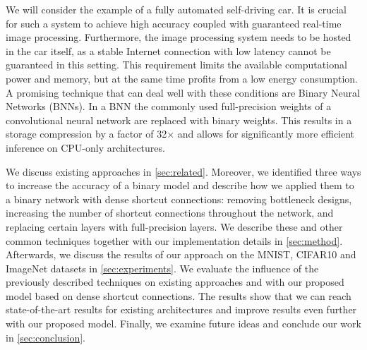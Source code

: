 \documentclass[10pt,twocolumn,letterpaper]{article}
\begin{document}
We will consider the example of a fully automated self-driving car. %
It is crucial for such a system to achieve high accuracy coupled with guaranteed real-time image processing.
Furthermore, the image processing system needs to be hosted in the car itself, as a stable Internet connection with low latency cannot be guaranteed in this setting.
This requirement limits the available computational power and memory, but at the same time profits from a low energy consumption.
A promising technique that can deal well with these conditions are Binary Neural Networks (BNNs).
In a BNN the commonly used full-precision weights of a convolutional neural network are replaced with binary weights.
This results in a storage compression by a factor of 32$\times$ and allows for significantly more efficient inference on CPU-only architectures.


We discuss existing approaches in \autoref{sec:related}.
Moreover, we identified three ways to increase the accuracy of a binary model and describe how we applied them to a binary network with dense shortcut connections:
removing bottleneck designs, increasing the number of shortcut connections throughout the network, and replacing certain layers with full-precision layers.
We describe these and other common techniques together with our implementation details in \autoref{sec:method}.
Afterwards, we discuss the results of our approach on the MNIST, CIFAR10 and ImageNet datasets in \autoref{sec:experiments}.
We evaluate the influence of the previously described techniques on existing approaches and with our proposed model based on dense shortcut connections.
The results show that we can reach state-of-the-art results for existing architectures and improve results even further with our proposed model.
Finally, we examine future ideas and conclude our work in \autoref{sec:conclusion}.
\end{document}
